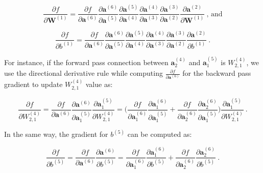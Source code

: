 \begin{equation}
	\label{eq:compute_dl/dW}
	\frac{\partial f}{\partial \textbf{W}^{(1)}} = \frac{\partial f}{\partial \textbf{a}^{(6)}}  \frac{\partial \textbf{a}^{(6)}}{\partial \textbf{a}^{(5)}}  \frac{\partial \textbf{a}^{(5)}}{\partial \textbf{a}^{(4)}}  \frac{\partial \textbf{a}^{(4)}}{\partial \textbf{a}^{(3)}}  \frac{\partial \textbf{a}^{(3)}}{\partial \textbf{a}^{(2)}}  \frac{\partial \textbf{a}^{(2)}}{\partial \textbf{W}
		^{(1)}}\:\text{, and}
\end{equation} 



\begin{equation}
	\label{eq:compute_dl/db}
	\frac{\partial f}{\partial b^{(1)}} = \frac{\partial f}{\partial \textbf{a}^{(6)}}  \frac{\partial \textbf{a}^{(6)}}{\partial \textbf{a}^{(5)}}  \frac{\partial \textbf{a}^{(5)}}{\partial \textbf{a}^{(4)}}  \frac{\partial \textbf{a}^{(4)}}{\partial \textbf{a}^{(3)}}  \frac{\partial \textbf{a}^{(3)}}{\partial \textbf{a}^{(2)}}  \frac{\partial \textbf{a}^{(2)}}{\partial b^{(1)}}\:\text{.}
\end{equation} 



For instance, if the forward pass connection between $\textbf{a}_{2}^{(4)}$ and $\textbf{a}_{1}^{(5)}$ is $W^{(4)}_{2,1}$, we use the directional derivative rule while computing $\frac{\partial f}{\partial \textbf{a}^{(6)}}$ for the backward pass gradient to update $W^{(4)}_{2,1}$ value as: 


\begin{equation}
	\label{eq:compute_specific_weight}
	\frac{\partial f}{\partial W^{(4)}_{2,1}} = \frac{\partial f}{\partial \textbf{a}^{(6)}} \frac{\partial \textbf{a}^{(6)}}{\partial \textbf{a}_{1}^{(5)}}  \frac{\partial \textbf{a}_{1}^{(5)}}{\partial W^{(4)}_{2,1}} = \Big ( \frac{\partial f}{\partial \textbf{a}_{1}^{(6)}}  \frac{\partial \textbf{a}_{1}^{(6)}}{\partial \textbf{a}_{1}^{(5)}} + \frac{\partial f}{\partial \textbf{a}_{2}^{(6)}} \frac{\partial \textbf{a}_{2}^{(6)}}{\partial \textbf{a}_{1}^{(5)}} \Big )  \frac{\partial \textbf{a}_{1}^{(5)}}{\partial W^{(4)}_{2,1}} \:\text{.}
\end{equation} 


In the same way, the gradient for $b^{(5)}$ can be computed as: 


\begin{equation}
	\label{eq:compute_specific_bias}
	\frac{\partial f}{\partial b^{(5)}} = \frac{\partial f}{\partial \textbf{a}^{(6)}}  \frac{\partial \textbf{a}^{(6)}}{\partial b^{(5)}} = \frac{\partial f}{\partial \textbf{a}_{1}^{(6)}}  \frac{\partial \textbf{a}_{1}^{(6)}}{\partial b^{(5)}} + \frac{\partial f}{\partial \textbf{a}_{2}^{(6)}}  \frac{\partial \textbf{a}_{2}^{(6)}}{\partial b^{(5)}}\:\text{.}
\end{equation} 



